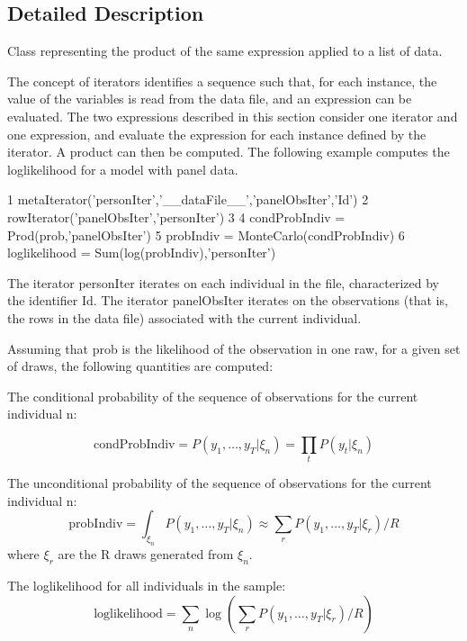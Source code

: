 \subsection{Detailed Description}
Class representing the product of the same expression applied to a list of data. 

The concept of iterators identifies a sequence such that, for each instance, the value of the variables is read from the data file, and an expression can be evaluated. The two expressions described in this section consider one iterator and one expression, and evaluate the expression for each instance defined by the iterator. A product can then be computed. The following example computes the loglikelihood for a model with panel data. 
\begin{DoxyCode}
1 metaIterator(\textcolor{stringliteral}{'personIter'},\textcolor{stringliteral}{'\_\_dataFile\_\_'},\textcolor{stringliteral}{'panelObsIter'},\textcolor{stringliteral}{'Id'})
2 rowIterator(\textcolor{stringliteral}{'panelObsIter'},\textcolor{stringliteral}{'personIter'})
3 
4 condProbIndiv = Prod(prob,\textcolor{stringliteral}{'panelObsIter'})
5 probIndiv = MonteCarlo(condProbIndiv)
6 loglikelihood = Sum(log(probIndiv),\textcolor{stringliteral}{'personIter'})
\end{DoxyCode}
 The iterator person\+Iter iterates on each individual in the file, characterized by the identifier Id. The iterator panel\+Obs\+Iter iterates on the observations (that is, the rows in the data file) associated with the current individual.

Assuming that prob is the likelihood of the observation in one raw, for a given set of draws, the following quantities are computed\+:
\begin{DoxyItemize}
\item The conditional probability of the sequence of observations for the current individual n\+:
\end{DoxyItemize}

\[ \mbox{condProbIndiv} = P(y_1,\ldots,y_T|\xi_n) = \prod_t P(y_t|\xi_n)\]


\begin{DoxyItemize}
\item The unconditional probability of the sequence of observations for the current individual n\+: \[ \mbox{probIndiv} = \int_{\xi_n}P(y_1,\ldots,y_T|\xi_n) \approx \sum_r P(y_1,\ldots,y_T|\xi_r) / R \] where $\xi_r$ are the R draws generated from $\xi_n$.
\item The loglikelihood for all individuals in the sample\+: \[ \mbox{loglikelihood} = \sum_n \log(\sum_r P(y_1,\ldots,y_T|\xi_r) / R) \] 
\end{DoxyItemize}


